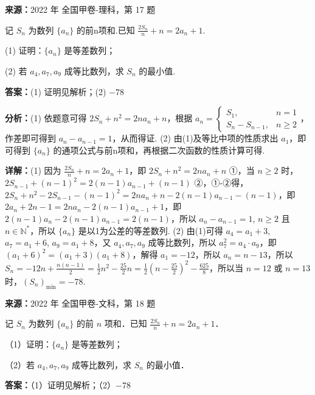 \begin{question}[points=12]
\textbf{来源：}2022 年 全国甲卷-理科，第 17 题\par
记 $S_n$ 为数列 $\{a_n\}$ 的前n项和.已知 $\frac{2S_n}{n}+n=2a_n+1$.

(1) 证明：$\{a_n\}$ 是等差数列；

(2) 若 $a_4, a_7, a_9$ 成等比数列，求 $S_n$ 的最小值.
\begin{solution}
\textbf{答案：}(1) 证明见解析；(2) $-78$

\textbf{分析：}(1) 依题意可得 $2S_n+n^2=2na_n+n$，根据 $a_n=\begin{cases} S_1, & n=1 \\ S_n-S_{n-1}, & n\ge 2 \end{cases}$，作差即可得到 $a_n-a_{n-1}=1$，从而得证. (2) 由(1)及等比中项的性质求出 $a_1$，即可得到 $\{a_n\}$ 的通项公式与前n项和，再根据二次函数的性质计算可得.

\textbf{详解：}(1) 因为 $\frac{2S_n}{n}+n=2a_n+1$，即 $2S_n+n^2=2na_n+n$ ①，当 $n\ge 2$ 时，$2S_{n-1}+(n-1)^2=2(n-1)a_{n-1}+(n-1)$ ②，①-②得，$2S_n+n^2-2S_{n-1}-(n-1)^2=2na_n+n-2(n-1)a_{n-1}-(n-1)$，即 $2a_n+2n-1=2na_n-2(n-1)a_{n-1}+1$，即 $2(n-1)a_n-2(n-1)a_{n-1}=2(n-1)$，所以 $a_n-a_{n-1}=1$, $n\ge 2$ 且 $n\in\mathbb{N}^*$，所以 $\{a_n\}$ 是以1为公差的等差数列.
(2) 由(1)可得 $a_4=a_1+3$, $a_7=a_1+6$, $a_9=a_1+8$，又 $a_4, a_7, a_9$ 成等比数列，所以 $a_7^2=a_4\cdot a_9$，即 $(a_1+6)^2=(a_1+3)(a_1+8)$，解得 $a_1=-12$，所以 $a_n=n-13$，所以 $S_n=-12n+\frac{n(n-1)}{2}=\frac{1}{2}n^2-\frac{25}{2}n=\frac{1}{2}\left(n-\frac{25}{2}\right)^2-\frac{625}{8}$，所以当 $n=12$ 或 $n=13$ 时，$(S_n)_{\min}=-78$.
\end{solution}
\end{question}

\begin{question}[points=12]
\textbf{来源：}2022 年 全国甲卷-文科，第 18 题\par
记 $S_n$ 为数列 $\{a_n\}$ 的前 $n$ 项和．已知 $\frac{2S_n}{n}+n=2a_n+1$．

（1）证明：$\{a_n\}$ 是等差数列；

（2）若 $a_4, a_7, a_9$ 成等比数列，求 $S_n$ 的最小值．
\begin{solution}
\textbf{答案：}（1）证明见解析；（2）$-78$
\end{solution}
\end{question}

